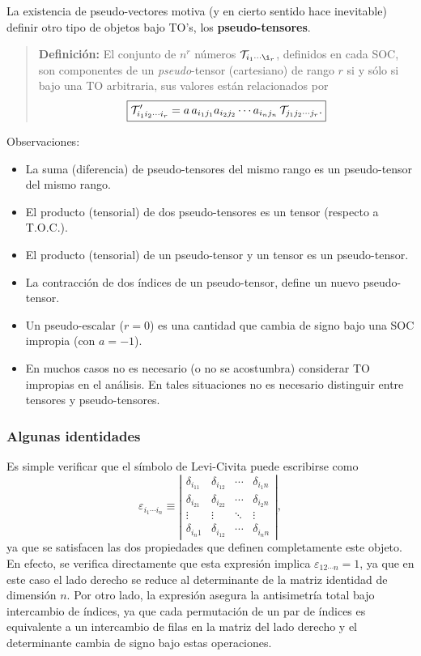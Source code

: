 La existencia de pseudo-vectores motiva (y en cierto sentido hace inevitable) definir otro tipo de objetos bajo TO's, los \textbf{pseudo-tensores}.

\begin{quotation}
\textbf{Definición:} El conjunto de $n^r$ números ${\cal T}_{i_1\cdots\i_r}$, definidos en cada SOC, son componentes de un \textit{pseudo}-tensor (cartesiano) de rango $r$ si y sólo si bajo una TO arbitraria, sus valores están relacionados por 
\begin{equation}\label{dcalTr}
\boxed{{\cal T}'_{i_1i_2\cdots i_r}=a\,a_{i_1j_1}a_{i_2j_2}\cdots a_{i_nj_n}\,{\cal T}_{j_1j_2\cdots j_r}.}
\end{equation}
\end{quotation}
Observaciones:
\begin{itemize}
\item La suma (diferencia) de pseudo-tensores del mismo rango es un pseudo-tensor del mismo rango.
\item El producto (tensorial) de dos pseudo-tensores es un tensor (respecto a T.O.C.).
\item El producto (tensorial) de un pseudo-tensor y un tensor es un pseudo-tensor.
\item La contracción de dos índices de un pseudo-tensor, define un nuevo pseudo-tensor.
\item Un pseudo-escalar ($r=0$) es una cantidad que cambia de signo bajo una SOC impropia (con $a=-1$).
\item En muchos casos no es necesario (o no se acostumbra) considerar TO impropias en el análisis. En tales situaciones no es necesario distinguir entre tensores y pseudo-tensores.
\end{itemize}

\subsubsection{Algunas identidades}
Es simple verificar que el símbolo de Levi-Civita puede escribirse como
\begin{equation}\label{epdet}
\varepsilon_{i_1\cdots i_n}\equiv  \left|\begin{array}{cccc}
\delta_{i_11} & \delta_{i_12} & \cdots & \delta_{i_1n} \\ 
\delta_{i_21} & \delta_{i_22} & \cdots & \delta_{i_2n} \\ 
\vdots & \vdots & \ddots & \vdots \\ 
\delta_{i_n1} & \delta_{i_12} & \cdots & \delta_{i_nn}
\end{array} \right| ,
\end{equation}
ya que se satisfacen las dos propiedades que definen completamente este objeto. En efecto, se verifica directamente que esta expresión implica $\varepsilon_{12\cdots n}=1$, ya que en este caso el lado derecho se reduce al determinante de la matriz identidad de dimensión $n$. Por otro lado, la expresión asegura la antisimetría total bajo intercambio de índices, ya que cada permutación de un par de índices es equivalente a un intercambio de filas en la matriz del lado derecho y el determinante cambia de signo bajo estas operaciones.

